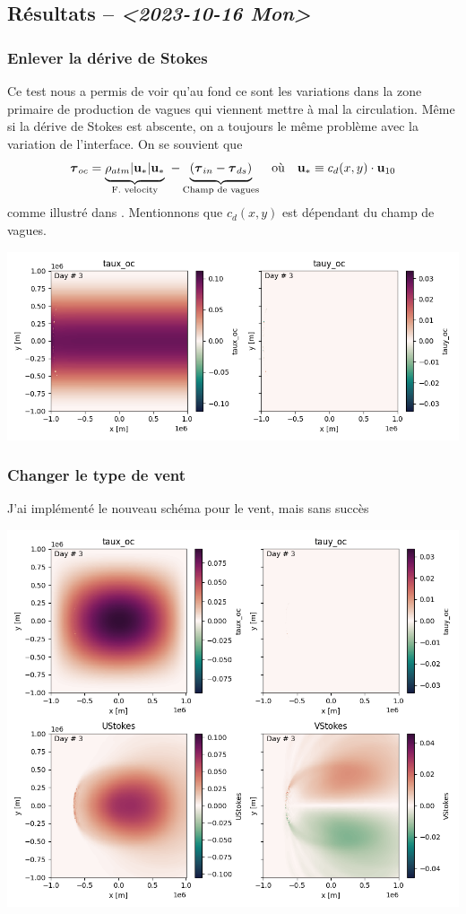 \documentclass[10pt]{article}
\numberwithin{equation}{section}
\newcommand{\uu}{\vb{u}}
\newcommand{\tall}{\vphantom{pA^{x^x}_p}}
\begin{document}
\newpage

\subsection{Résultats -- \textit{<2023-10-16 Mon>}}
\label{sec:org6953624}

\subsubsection{Enlever la dérive de Stokes}
\label{sec:orgdd08825}
Ce test nous a permis de voir qu'au fond ce sont les variations dans la zone primaire de production de vagues qui viennent mettre à mal la circulation.
Même si la dérive de Stokes est abscente, on a toujours le même problème avec la variation de l'interface.
On se souvient que
\begin{align}
   && \boldsymbol{\tau}_{oc} = \underbrace{\rho_{atm} |\uu_*|\uu_*\tall}_\text{F. velocity} \ - \underbrace{\qty(\boldsymbol{\tau}_{in} - \boldsymbol{\tau}_{ds})\tall}_\text{Champ de vagues} && \text{où} && \uu_* \equiv c_d(x,y)\cdot\uu_{10} &&
\end{align}
comme illustré dans \autocite{breivik_al_2015}.
Mentionnons que \(c_d(x,y)\) est dépendant du champ de vagues. 
\begin{center}
\includegraphics[width=.9\linewidth]{figures/debuggage/2023_10_16_nostokes_tauoc.png}
\end{center}

\subsubsection{Changer le type de vent}
\label{sec:org4ee77e1}
J'ai implémenté le nouveau schéma pour le vent, mais sans succès

\begin{center}
\includegraphics[width=.9\linewidth]{figures/debuggage/2023_10_16_ramp_tauETUstokes.png}
\end{center}



\printbibliography
\end{document}
